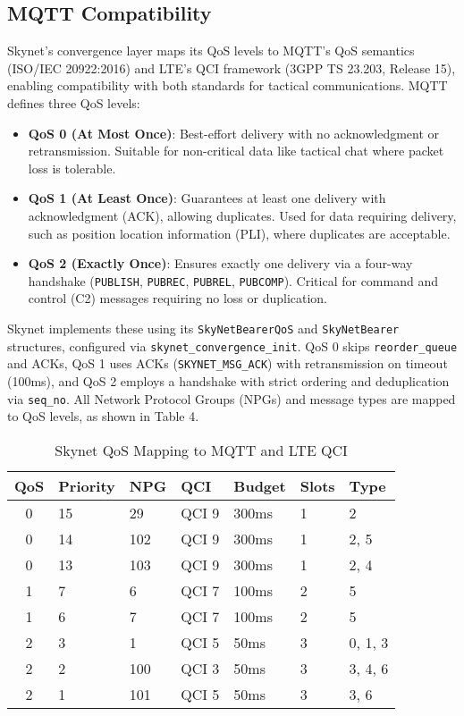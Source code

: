 \documentclass{article}
\begin{document}
\subsection{MQTT Compatibility}
Skynet’s convergence layer maps its QoS levels to MQTT’s QoS semantics (ISO/IEC 20922:2016) and LTE’s
QCI framework (3GPP TS 23.203, Release 15), enabling compatibility with both standards for tactical
communications. MQTT defines three QoS levels:
\begin{itemize}
    \item \textbf{QoS 0 (At Most Once)}: Best-effort delivery with no acknowledgment or retransmission.
          Suitable for non-critical data like tactical chat where packet loss is tolerable.
    \item \textbf{QoS 1 (At Least Once)}: Guarantees at least one delivery with acknowledgment (ACK),
          allowing duplicates. Used for data requiring delivery, such as position location information
          (PLI), where duplicates are acceptable.
    \item \textbf{QoS 2 (Exactly Once)}: Ensures exactly one delivery via a four-way handshake
          (\texttt{PUBLISH}, \texttt{PUBREC}, \texttt{PUBREL}, \texttt{PUBCOMP}). Critical for
          command and control (C2) messages requiring no loss or duplication.
\end{itemize}
Skynet implements these using its \texttt{SkyNetBearerQoS} and \texttt{SkyNetBearer} structures,
configured via \texttt{skynet\_convergence\_init}. QoS 0 skips \texttt{reorder\_queue} and ACKs, QoS 1
uses ACKs (\texttt{SKYNET\_MSG\_ACK}) with retransmission on timeout (100ms), and QoS 2 employs a
handshake with strict ordering and deduplication via \texttt{seq\_no}. All Network Protocol Groups
(NPGs) and message types are mapped to QoS levels, as shown in Table 4.

\begin{table}[h]
\centering
\caption{Skynet QoS Mapping to MQTT and LTE QCI}
\begin{tabular}{cllllll}
\hline
\textbf{QoS} & \textbf{Priority} & \textbf{NPG} & \textbf{QCI} & \textbf{Budget} & \textbf{Slots} & \textbf{Type} \\
\hline
0 & 15 & 29  & QCI 9 & 300ms & 1 & 2 \\
0 & 14 & 102 & QCI 9 & 300ms & 1 & 2, 5 \\
0 & 13 & 103 & QCI 9 & 300ms & 1 & 2, 4 \\
1 & 7  & 6   & QCI 7 & 100ms & 2 & 5 \\
1 & 6  & 7   & QCI 7 & 100ms & 2 & 5 \\
2 & 3  & 1   & QCI 5 & 50ms  & 3 & 0, 1, 3 \\
2 & 2  & 100 & QCI 3 & 50ms  & 3 & 3, 4, 6 \\
2 & 1  & 101 & QCI 5 & 50ms  & 3 & 3, 6 \\
\hline
\end{tabular}
\end{table}
\end{document}
